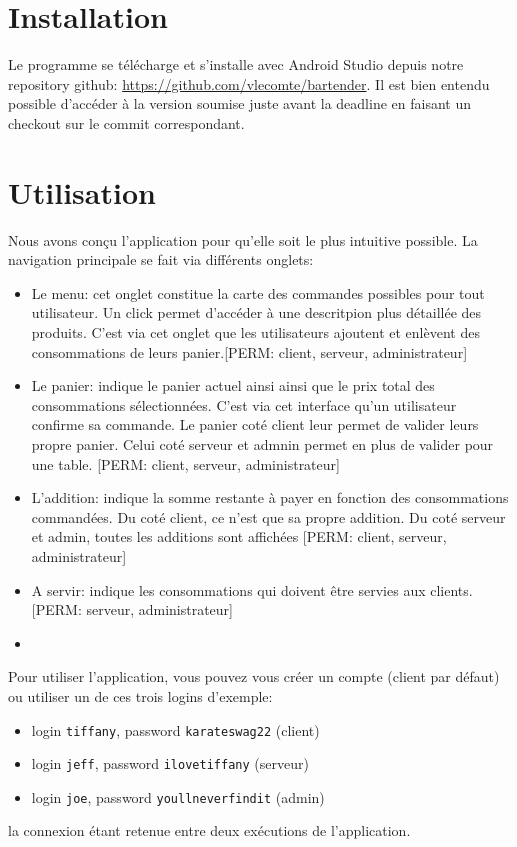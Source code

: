 \documentclass[a4paper,10pt]{article}
\begin{document}

\section{Installation}

Le programme se télécharge et s'installe avec Android Studio depuis notre repository github:
\url{https://github.com/vlecomte/bartender}.
Il est bien entendu possible d'accéder à la version soumise juste avant la deadline en faisant un checkout sur le commit correspondant.

\section{Utilisation}

Nous avons conçu l'application pour qu'elle soit le plus intuitive possible. La navigation principale se fait via différents onglets:
\begin{itemize}
    \item{Le menu: cet onglet constitue la carte des commandes possibles pour tout utilisateur. Un click permet d'accéder à une descritpion plus détaillée des produits. C'est via cet onglet que les utilisateurs ajoutent et enlèvent des consommations de leurs panier.[PERM: client, serveur, administrateur]}
    	\item{Le panier: indique le panier actuel ainsi ainsi que le prix total des consommations sélectionnées. C'est via cet interface qu'un utilisateur confirme sa commande. Le panier coté client leur permet de valider leurs propre panier. Celui coté serveur et admnin permet en plus de valider pour une table. [PERM: client, serveur, administrateur]}
    	\item{L'addition: indique la somme restante à payer en fonction des consommations commandées. Du coté client, ce n'est que sa propre addition. Du coté serveur et admin, toutes les additions sont affichées [PERM: client, serveur, administrateur]}
    	\item{A servir: indique les consommations qui doivent être servies aux clients. [PERM: serveur, administrateur]}
    	\item
    	
\end{itemize}

Pour utiliser l'application, vous pouvez vous créer un compte (client par défaut) ou utiliser un de ces trois logins d'exemple:
\begin{itemize}
    \item login \texttt{tiffany}, password \texttt{karateswag22} (client)
    \item login \texttt{jeff}, password \texttt{ilovetiffany} (serveur)
    \item login \texttt{joe}, password \texttt{youllneverfindit} (admin)
\end{itemize}
la connexion étant retenue entre deux exécutions de l'application.
\end{document}
